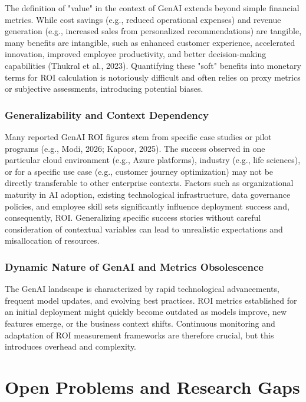 \documentclass[10pt,twocolumn,letterpaper]{article}
\begin{document}
The definition of "value" in the context of GenAI extends beyond simple financial metrics. While cost savings (e.g., reduced operational expenses) and revenue generation (e.g., increased sales from personalized recommendations) are tangible, many benefits are intangible, such as enhanced customer experience, accelerated innovation, improved employee productivity, and better decision-making capabilities (Thukral et al., 2023). Quantifying these "soft" benefits into monetary terms for ROI calculation is notoriously difficult and often relies on proxy metrics or subjective assessments, introducing potential biases.


\subsubsection{Generalizability and Context Dependency}

Many reported GenAI ROI figures stem from specific case studies or pilot programs (e.g., Modi, 2026; Kapoor, 2025). The success observed in one particular cloud environment (e.g., Azure platforms), industry (e.g., life sciences), or for a specific use case (e.g., customer journey optimization) may not be directly transferable to other enterprise contexts. Factors such as organizational maturity in AI adoption, existing technological infrastructure, data governance policies, and employee skill sets significantly influence deployment success and, consequently, ROI. Generalizing specific success stories without careful consideration of contextual variables can lead to unrealistic expectations and misallocation of resources.


\subsubsection{Dynamic Nature of GenAI and Metrics Obsolescence}

The GenAI landscape is characterized by rapid technological advancements, frequent model updates, and evolving best practices. ROI metrics established for an initial deployment might quickly become outdated as models improve, new features emerge, or the business context shifts. Continuous monitoring and adaptation of ROI measurement frameworks are therefore crucial, but this introduces overhead and complexity.


\section{Open Problems and Research Gaps}
\end{document}
